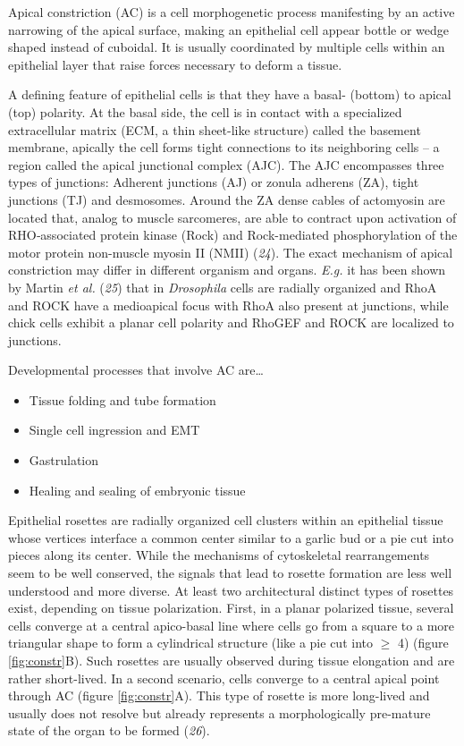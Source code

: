 \documentclass[10pt, b5paper, singlespacinge, twoside]{reedthesis} %
\providecommand{\tightlist}{%
  \setlength{\itemsep}{0pt}\setlength{\parskip}{0pt}}
\theoremstyle{definition}
\theoremstyle{definition}
\theoremstyle{definition}
\theoremstyle{remark}
\begin{document}
Apical constriction (AC) is a cell morphogenetic process manifesting by an active narrowing of the apical surface, making an epithelial cell appear bottle or wedge shaped instead of cuboidal. It is usually coordinated by multiple cells within an epithelial layer that raise forces necessary to deform a tissue.

A defining feature of epithelial cells is that they have a basal- (bottom) to apical (top) polarity. At the basal side, the cell is in contact with a specialized extracellular matrix (ECM, a thin sheet-like structure) called the basement membrane, apically the cell forms tight connections to its neighboring cells -- a region called the apical junctional complex (AJC). The AJC encompasses three types of junctions: Adherent junctions (AJ) or zonula adherens (ZA), tight junctions (TJ) and desmosomes. Around the ZA dense cables of actomyosin are located that, analog to muscle sarcomeres, are able to contract upon activation of RHO‑associated protein kinase (Rock) and Rock-mediated phosphorylation of the motor protein non-muscle myosin II (NMII) (\emph{24}). The exact mechanism of apical constriction may differ in different organism and organs. \emph{E.g.} it has been shown by Martin \emph{et al.} (\emph{25}) that in \emph{Drosophila} cells are radially organized and RhoA and ROCK have a medioapical focus with RhoA also present at junctions, while chick cells exhibit a planar cell polarity and RhoGEF and ROCK are localized to junctions.

Developmental processes that involve AC are\ldots{}
\begin{itemize}
\tightlist
\item
  Tissue folding and tube formation
\item
  Single cell ingression and EMT
\item
  Gastrulation
\item
  Healing and sealing of embryonic tissue
\end{itemize}
Epithelial rosettes are radially organized cell clusters within an epithelial tissue whose vertices interface a common center similar to a garlic bud or a pie cut into pieces along its center. While the mechanisms of cytoskeletal rearrangements seem to be well conserved, the signals that lead to rosette formation are less well understood and more diverse.
At least two architectural distinct types of rosettes exist, depending on tissue polarization.
First, in a planar polarized tissue, several cells converge at a central apico-basal line where cells go from a square to a more triangular shape to form a cylindrical structure (like a pie cut into \(\geq\) 4) (figure \ref{fig:constr}B). Such rosettes are usually observed during tissue elongation and are rather short-lived. In a second scenario, cells converge to a central apical point through AC (figure \ref{fig:constr}A). This type of rosette is more long-lived and usually does not resolve but already represents a morphologically pre-mature state of the organ to be formed (\emph{26}).
\end{document}
